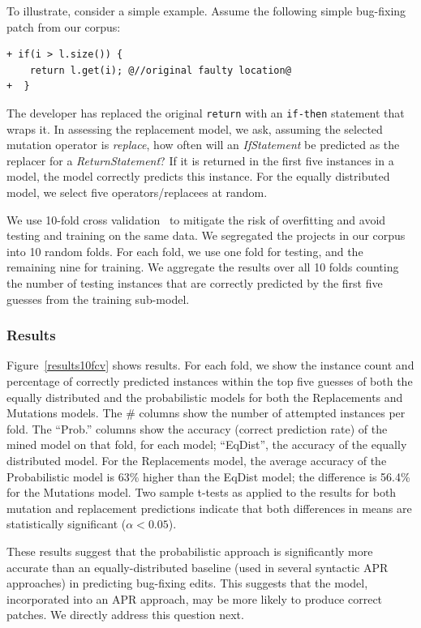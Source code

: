 \documentclass[conference]{IEEEtran}
\begin{document}
To illustrate, consider a simple example. Assume the following
simple bug-fixing patch from our corpus: 

\begin{lstlisting}[frame=single]
+ if(i > l.size()) {
    return l.get(i); @//original faulty location@
+  }    
\end{lstlisting}

The developer has replaced the original \texttt{return} with an
\texttt{if-then} statement that wraps it.  In assessing the replacement model,
we ask, assuming the selected mutation operator 
is \emph{replace}, how often will an \emph{IfStatement} be predicted as the
replacer for a \emph{ReturnStatement}? If it is returned in the first five
instances in a model, the model correctly predicts this instance.  For the
equally distributed model, we select five operators/replacees at random. 

We use 10-fold cross validation~\cite{kohavi95} to mitigate the risk
of overfitting and avoid testing and training on the same data.  We segregated
the projects in our corpus into 10 random folds. For each fold, we use one fold
for testing, and the remaining nine for training. We aggregate the results over
all 10 folds counting the number of testing instances that are correctly
predicted by the first five guesses from the training sub-model.

\subsubsection{Results} 

Figure~\ref{results10fcv} shows results. For each fold, we show the instance
count and percentage of correctly predicted instances within the top five
guesses of both the equally distributed and the probabilistic  models for both the
Replacements and Mutations models. The \# columns 
show the number of attempted instances per fold.  The ``Prob.'' columns show the
accuracy (correct prediction rate) of the mined model on that fold, for each model; ``EqDist'',
the accuracy of the equally distributed model.  For the Replacements model,
the average accuracy of the Probabilistic model is 63\% higher than the EqDist
model; the difference is 56.4\% for the Mutations model.
Two sample t-tests as applied to the results for both mutation and replacement
predictions indicate that both differences in means are statistically significant
($\alpha<0.05$). 

These results suggest that the probabilistic approach is
significantly more accurate than an equally-distributed baseline (used in
several syntactic APR approaches) in predicting bug-fixing edits.  This suggests
that the model, incorporated into an APR approach, may be more likely to produce
correct patches.  We directly address this question next.
\end{document}
